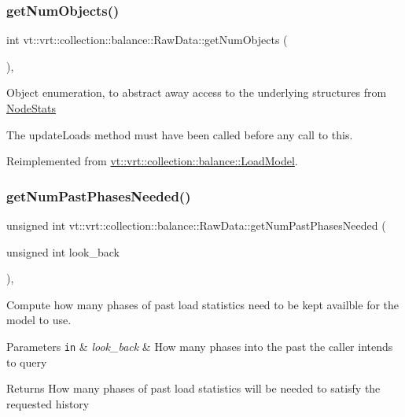 \subsubsection{\texorpdfstring{get\+Num\+Objects()}{getNumObjects()}}
{\footnotesize\ttfamily int vt\+::vrt\+::collection\+::balance\+::\+Raw\+Data\+::get\+Num\+Objects (\begin{DoxyParamCaption}{ }\end{DoxyParamCaption})\hspace{0.3cm}{\ttfamily [override]}, {\ttfamily [virtual]}}

Object enumeration, to abstract away access to the underlying structures from \hyperlink{structvt_1_1vrt_1_1collection_1_1balance_1_1_node_stats}{Node\+Stats}

The {\ttfamily update\+Loads} method must have been called before any call to this. 

Reimplemented from \hyperlink{structvt_1_1vrt_1_1collection_1_1balance_1_1_load_model_ab4027d0849dee5b28273094cc179abd2}{vt\+::vrt\+::collection\+::balance\+::\+Load\+Model}.

\mbox{\label{structvt_1_1vrt_1_1collection_1_1balance_1_1_raw_data_a8f709c3aeaf10e92c746d773d7ba6f9c}} 
\subsubsection{\texorpdfstring{get\+Num\+Past\+Phases\+Needed()}{getNumPastPhasesNeeded()}}
{\footnotesize\ttfamily unsigned int vt\+::vrt\+::collection\+::balance\+::\+Raw\+Data\+::get\+Num\+Past\+Phases\+Needed (\begin{DoxyParamCaption}\item[{unsigned int}]{look\+\_\+back }\end{DoxyParamCaption})\hspace{0.3cm}{\ttfamily [override]}, {\ttfamily [virtual]}}



Compute how many phases of past load statistics need to be kept availble for the model to use. 


\begin{DoxyParams}[1]{Parameters}
\mbox{\tt in}  & {\em look\+\_\+back} & How many phases into the past the caller intends to query\\
\hline
\end{DoxyParams}
\begin{DoxyReturn}{Returns}
How many phases of past load statistics will be needed to satisfy the requested history 
\end{DoxyReturn}


